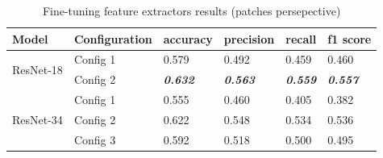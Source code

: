 \documentclass[
11pt, %
english, %
singlespacing, %
headsepline, %
]{project_structure}
\newcommand{\subpar}[1]{\paragraph*{#1}}
\begin{document}

\begin{table}[H]
\centering
\label{tab:resnet_hyperparameters_3}
\begin{tabular}{@{}llllll@{}}
\toprule
\textbf{Model} & \textbf{Configuration} & \textbf{accuracy} & \textbf{precision} & \textbf{recall} & \textbf{f1 score} \\
\midrule
\multirow{2}{*}{\acrshort{ResNet}-18} & \multicolumn{1}{l}{\acrshort{Config} 1} & \multicolumn{1}{l}{0.579} & \multicolumn{1}{l}{0.492} & \multicolumn{1}{l}{0.459} & \multicolumn{1}{l}{0.460} \\
 
 & \multicolumn{1}{l}{\acrshort{Config} 2} & \multicolumn{1}{l}{\textbf{\textit{0.632}}} & \multicolumn{1}{l}{\textbf{\textit{0.563}}} & \multicolumn{1}{l}{\textbf{\textit{0.559}}} & \multicolumn{1}{l}{\textbf{\textit{0.557}}} \\

 \midrule
 
 \multirow{3}{*}{\acrshort{ResNet}-34} & \multicolumn{1}{l}{\acrshort{Config} 1} & \multicolumn{1}{l}{0.555} & \multicolumn{1}{l}{0.460} & \multicolumn{1}{l}{0.405} & \multicolumn{1}{l}{0.382} \\
 
 & \multicolumn{1}{l}{\acrshort{Config} 2} & \multicolumn{1}{l}{0.622} & \multicolumn{1}{l}{0.548} & \multicolumn{1}{l}{0.534} & \multicolumn{1}{l}{0.536} \\
  
 & \multicolumn{1}{l}{\acrshort{Config} 3} & \multicolumn{1}{l}{0.592} & \multicolumn{1}{l}{0.518} & \multicolumn{1}{l}{0.500} & \multicolumn{1}{l}{0.495} \\
\bottomrule

\end{tabular}
\caption{Fine-tuning feature extractors results (patches persepective)}
\label{tab:fine_tuning_results_patches}
\end{table}

\end{document}

